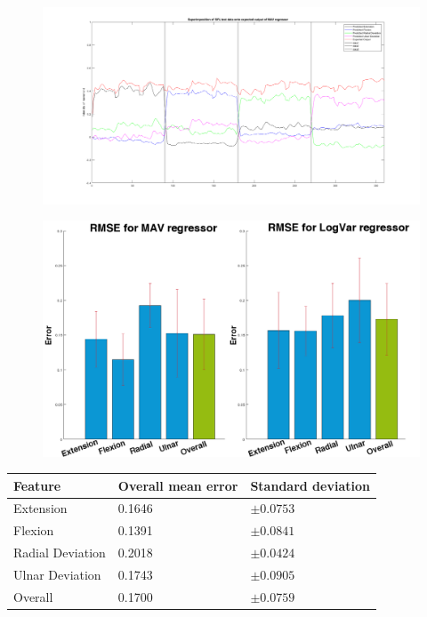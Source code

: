 \begin{figure}[H]
	\includegraphics[width=1\textwidth]{figures/results/SuperPoisonMavNewData}  %
	\caption{}
	\label{fig:SuperPoisonMavNewData}  %
\end{figure}


\begin{figure}[H]
	\includegraphics[width=1\textwidth]{figures/results/RMSEBarPlotNewData}  %
	\caption{}
	\label{fig:RMSEBarPlotNewData}  %
\end{figure}

	\begin{center}
		\begin{tabular}{l l l}
			\toprule
			\textbf{Feature} & \textbf{Overall mean error} & \textbf{Standard deviation}\\
			\midrule
			Extension & 0.1646 & $\pm 0.0753$ \\
			Flexion & 0.1391 & $\pm 0.0841$ \\
			Radial Deviation & 0.2018 & $\pm 0.0424$ \\
			Ulnar Deviation & 0.1743 & $\pm 0.0905$ \\
			Overall & 0.1700 & $\pm 0.0759$ \\
			\bottomrule
		\end{tabular}
	\end{center}
	

